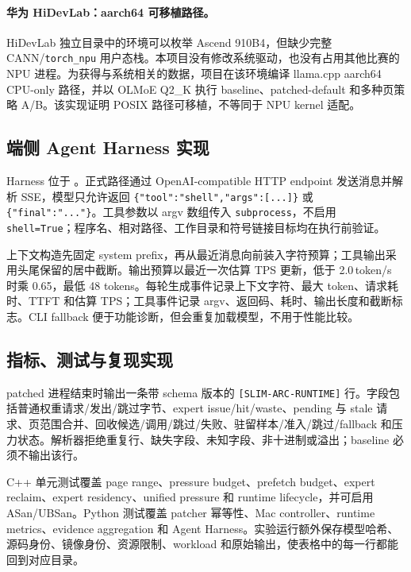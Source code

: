\paragraph{华为 HiDevLab：aarch64 可移植路径。}

HiDevLab 独立目录中的环境可以枚举 Ascend 910B4，但缺少完整 CANN/\texttt{torch\_npu} 用户态栈。本项目没有修改系统驱动，也没有占用其他比赛的 NPU 进程。为获得与系统相关的数据，项目在该环境编译 llama.cpp aarch64 CPU-only 路径，并以 OLMoE Q2\_K 执行 baseline、patched-default 和多种页策略 A/B。该实现证明 POSIX 路径可移植，不等同于 NPU kernel 适配。

\subsection{端侧 Agent Harness 实现}

Harness 位于 。正式路径通过 OpenAI-compatible HTTP endpoint 发送消息并解析 SSE，模型只允许返回 \texttt{\{"tool":"shell","args":[...]\}} 或 \texttt{\{"final":"..."\}}。工具参数以 argv 数组传入 \texttt{subprocess}，不启用 \texttt{shell=True}；程序名、相对路径、工作目录和符号链接目标均在执行前验证。

上下文构造先固定 system prefix，再从最近消息向前装入字符预算；工具输出采用头尾保留的居中截断。输出预算以最近一次估算 TPS 更新，低于 2.0\,token/s 时乘 0.65，最低 48 tokens。每轮生成事件记录上下文字符、最大 token、请求耗时、TTFT 和估算 TPS；工具事件记录 argv、返回码、耗时、输出长度和截断标志。CLI fallback 便于功能诊断，但会重复加载模型，不用于性能比较。

\subsection{指标、测试与复现实现}

patched 进程结束时输出一条带 schema 版本的 \texttt{[SLIM-ARC-RUNTIME]} 行。字段包括普通权重请求/发出/跳过字节、expert issue/hit/waste、pending 与 stale 请求、页范围合并、回收候选/调用/跳过/失败、驻留样本/准入/跳过/fallback 和压力状态。解析器拒绝重复行、缺失字段、未知字段、非十进制或溢出；baseline 必须不输出该行。

C++ 单元测试覆盖 page range、pressure budget、prefetch budget、expert reclaim、expert residency、unified pressure 和 runtime lifecycle，并可启用 ASan/UBSan。Python 测试覆盖 patcher 幂等性、Mac controller、runtime metrics、evidence aggregation 和 Agent Harness。实验运行额外保存模型哈希、源码身份、镜像身份、资源限制、workload 和原始输出，使表格中的每一行都能回到对应目录。
